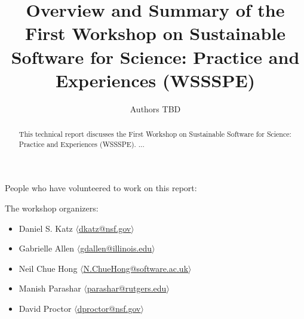 \documentclass[11pt, oneside]{amsart}
\begin{document}
\title[]{Overview and Summary of the First Workshop on Sustainable Software for Science: Practice and Experiences (WSSSPE)}

\author{Authors TBD}

%
%
%
%
%  

    
\begin{abstract}
This technical report discusses the First Workshop on Sustainable Software for Science: Practice and Experiences (WSSSPE). ...
\end{abstract}


\maketitle

People who have volunteered to work on this report:

The workshop organizers:
\begin{itemize}
\item Daniel S. Katz $\langle$\url{dkatz@nsf.gov}$\rangle$
\item Gabrielle Allen $\langle$\url{gdallen@illinois.edu}$\rangle$
\item Neil Chue Hong $\langle$\url{N.ChueHong@software.ac.uk}$\rangle$
\item Manish Parashar $\langle$\url{parashar@rutgers.edu}$\rangle$
\item David Proctor $\langle$\url{dproctor@nsf.gov}$\rangle$
\end{itemize}
\end{document}
